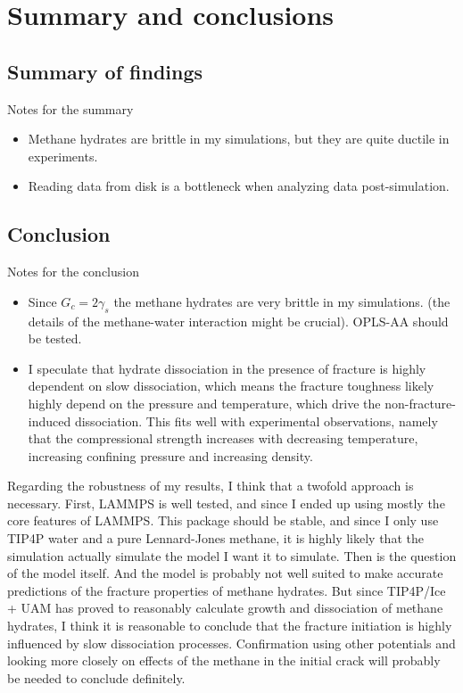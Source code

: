 \chapter{Summary and conclusions}
\label{ch:summary_conclusions}
\section{Summary of findings}
Notes for the summary
\begin{itemize}
\item Methane hydrates are brittle in my simulations, but they are quite ductile in experiments.
\item Reading data from disk is a bottleneck when analyzing data post-simulation. 
\end{itemize}

\section{Conclusion}
Notes for the conclusion
\begin{itemize}
\item Since $G_c = 2\gamma_s$ the methane hydrates are very brittle in my simulations. (the details of the methane-water interaction might be crucial). OPLS-AA should be tested.
\item I speculate that hydrate dissociation in the presence of fracture is highly dependent on slow dissociation, which means the fracture toughness likely highly depend on the pressure and temperature, which drive the non-fracture-induced dissociation. This fits well with experimental observations, namely that the compressional strength increases with decreasing temperature, increasing confining pressure and increasing density.
\end{itemize}

Regarding the robustness of my results, I think that a twofold approach is necessary. First, LAMMPS is well tested, and since I ended up using mostly the core features of LAMMPS. This package should be stable, and since I only use TIP4P water and a pure Lennard-Jones methane, it is highly likely that the simulation actually simulate the model I want it to simulate. Then is the question of the model itself. And the model is probably not well suited to make accurate predictions of the fracture properties of methane hydrates. But since TIP4P/Ice + UAM has proved to reasonably calculate growth and dissociation of methane hydrates, I think it is reasonable to conclude that the fracture initiation is highly influenced by slow dissociation processes. Confirmation using other potentials and looking more closely on effects of the methane in the initial crack will probably be needed to conclude definitely.

